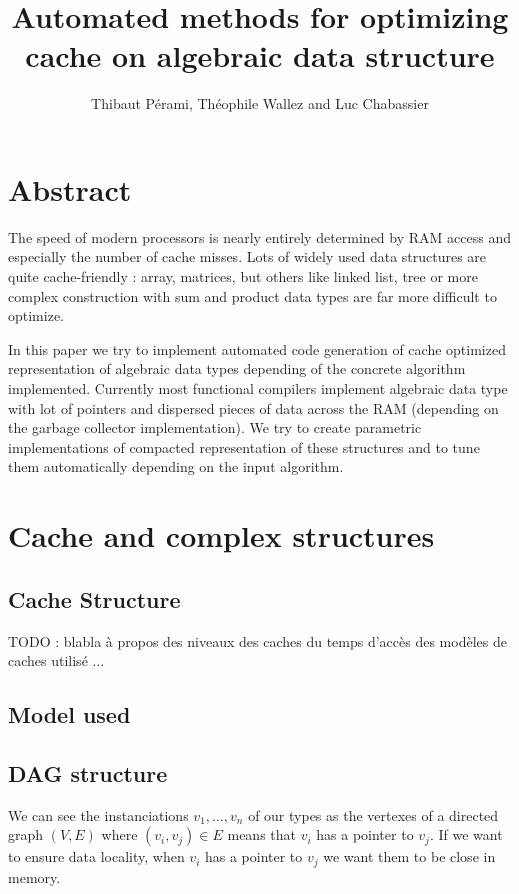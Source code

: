 \documentclass[12pt]{article}
\title{Automated methods for optimizing cache on algebraic data structure}
\author{Thibaut Pérami, Théophile Wallez and Luc Chabassier}
\begin{document}
\maketitle


\section{Abstract}

The speed of modern processors is nearly entirely determined by RAM access and
especially the number of cache misses. Lots of widely used data structures are
quite cache-friendly : array, matrices, but others like linked list, tree or
more complex construction with sum and product data types are far more difficult to
optimize.

In this paper we try to implement automated code generation of cache optimized
representation of algebraic data types depending of the concrete algorithm
implemented. Currently most functional compilers implement algebraic data type with
lot of pointers and dispersed pieces of data across the RAM (depending on the
garbage collector implementation). We try to create parametric implementations
of compacted representation of these structures and to tune them automatically
depending on the input algorithm.

\section{Cache and complex structures}

\subsection{Cache Structure}

TODO : blabla à propos des niveaux des caches du temps d'accès des modèles de
caches utilisé ...

\subsection{Model used}

\subsection{DAG structure}

We can see the instanciations $v_1, \dots, v_n$ of our types as the vertexes of a directed graph $(V, E)$ where $(v_i, v_j) \in E$ means that $v_i$ has a pointer to $v_j$.
If we want to ensure data locality, when $v_i$ has a pointer to $v_j$ we want them to be close in memory.
\end{document}
